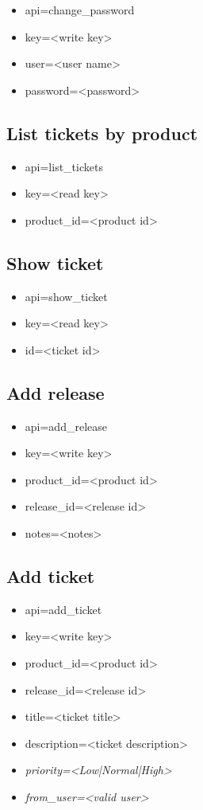 \documentclass[11pt]{article}
\begin{document}
\begin{itemize}
\item api=change\_password
\item key=<write key>
\item user=<user name>
\item password=<password>
\end{itemize}

\subsection{List tickets by product}

\begin{itemize}
\item api=list\_tickets
\item key=<read key>
\item product\_id=<product id>
\end{itemize}

\subsection{Show ticket}

\begin{itemize}
\item api=show\_ticket
\item key=<read key>
\item id=<ticket id>
\end{itemize}

\subsection{Add release}

\begin{itemize}
\item api=add\_release
\item key=<write key>
\item product\_id=<product id>
\item release\_id=<release id>
\item notes=<notes>
\end{itemize}

\subsection{Add ticket}

\begin{itemize}
\item api=add\_ticket
\item key=<write key>
\item product\_id=<product id>
\item release\_id=<release id>
\item title=<ticket title>
\item description=<ticket description>
\item \textit{priority=<Low|Normal|High>}
\item \textit{from\_user=<valid user>}
\end{itemize}
\end{document}

